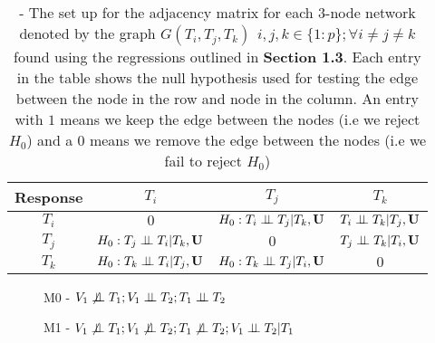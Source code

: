 \documentclass[12pt]{report}
\begin{document}
\begin{table}[H]
\centering
\caption{- The set up for the adjacency matrix for each 3-node network denoted by the graph $G(T_i, T_j, T_k) \ \ i,j,k\in\{1:p\}; \forall i\neq j\neq k$ found using the regressions outlined in \textbf{Section 1.3}. Each entry in the table shows the null hypothesis used for testing the edge between the node in the row and node in the column. An entry with $1$ means we keep the edge between the nodes (i.e we reject $H_0$) and a $0$ means we remove the edge between the nodes (i.e we fail to reject $H_0$)}
\begin{tabular}{|c||c|c|c|}
\hline
\bf Response  & $T_i$                                                 &  $T_j$                                           & $T_k$    \\ \hline \hline
$T_i$                &  $0$                                                  & $H_0: T_i \perp \!\!\! \perp T_j|T_k, {\bf U}$   & $T_i\perp \!\!\! \perp T_k |T_j, {\bf U}$                    \\ \hline 
$T_j$               &  $H_0: T_j \perp \!\!\! \perp T_i| T_k, {\bf U}$    &  $0$                                               & $T_j\perp \!\!\! \perp T_k|T_i, {\bf U}$                 \\ \hline
$T_k$               & $H_0: T_k \perp \!\!\! \perp T_i|T_j, {\bf U}$      &  $H_0: T_k \perp \!\!\! \perp T_j|T_i, {\bf U}$  & $0$                \\ \hline


\end{tabular}
\end{table}

\begin{figure}[H]
\begin{center}
\end{center}
\caption{M0 - $V_1\not\indep T_1 ; V_1 \indep T_2; T_1 \indep T_2$ }
\end{figure}


\begin{figure}[H]
\begin{center}
\end{center}
\caption{M1 - $V_1\not\indep T_1 ; V_1 \not\indep T_2; T_1 \not\indep T_2; V_1 \indep T_2 | T_1$}
\end{figure}
\end{document}
